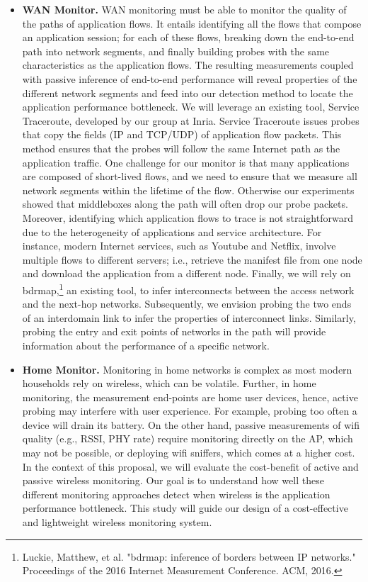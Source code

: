 \documentclass[11 pt]{article}
\begin{document}
\begin{itemize}
\item \textbf{WAN Monitor.} WAN monitoring must be able to monitor the quality of the paths of application flows. It entails identifying all the flows that compose an application session; for each of these flows, breaking down the end-to-end path into network segments, and finally building probes with the same characteristics as the application flows. The resulting measurements coupled with passive inference of end-to-end performance will reveal properties of the different network segments and feed into our detection method to locate the application performance bottleneck. We will leverage an existing tool, Service Traceroute, developed by our group at Inria. Service Traceroute issues probes that copy the fields (IP and TCP/UDP) of application flow packets. This method ensures that the probes will follow the same Internet path as the application traffic. One challenge for our monitor is that many applications are composed of short-lived flows, and we need to ensure that we measure all network segments within the lifetime of the flow. Otherwise our experiments showed that middleboxes along the path will often drop our probe packets. Moreover, identifying which application flows to trace is not straightforward due to the heterogeneity of applications and service architecture. For instance, modern Internet services, such as Youtube and Netflix, involve multiple flows to different servers; i.e., retrieve the manifest file from one node and download the application from a different node. Finally, we will rely on bdrmap,\footnote{Luckie, Matthew, et al. "bdrmap: inference of borders between IP networks." Proceedings of the 2016 Internet Measurement Conference. ACM, 2016.} an existing tool, to infer interconnects between the access network and the next-hop networks. Subsequently, we envision probing the two ends of an interdomain link to infer the properties of interconnect links. Similarly, probing the entry and exit points of networks in the path will provide information about the performance of a specific network.

\item \textbf{Home Monitor.} Monitoring in home networks is complex as most modern households rely on wireless, which can be volatile. Further, in home monitoring, the measurement end-points are home user devices, hence, active probing may interfere with user experience. For example, probing too often a device will drain its battery. On the other hand, passive measurements of wifi quality (e.g., RSSI, PHY rate) require monitoring directly on the AP, which may not be possible, or deploying wifi sniffers, which comes at a higher cost. In the context of this proposal, we will evaluate the cost-benefit of active and passive wireless monitoring. Our goal is to understand how well these different monitoring approaches detect when wireless is the application performance bottleneck. This study will guide our design of a cost-effective and lightweight wireless monitoring system.


\end{itemize}
\end{document}
